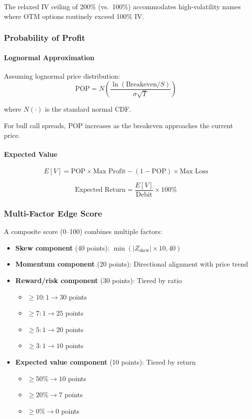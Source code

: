 The relaxed IV ceiling of 200\% (vs.\ 100\%) accommodates high-volatility names where OTM options routinely exceed 100\% IV.

\subsubsection{Probability of Profit}

\paragraph{Lognormal Approximation}

Assuming lognormal price distribution:
\[
\text{POP} = N\left(\frac{\ln(\text{Breakeven}/S)}{\sigma\sqrt{T}}\right)
\]

where $N(\cdot)$ is the standard normal CDF.

For bull call spreads, POP increases as the breakeven approaches the current price.

\paragraph{Expected Value}

\[
E[V] = \text{POP} \times \text{Max Profit} - (1 - \text{POP}) \times \text{Max Loss}
\]

\[
\text{Expected Return} = \frac{E[V]}{\text{Debit}} \times 100\%
\]

\subsubsection{Multi-Factor Edge Score}

A composite score (0--100) combines multiple factors:

\begin{itemize}
  \item \textbf{Skew component} (40 points): $\min(|Z_{\text{skew}}| \times 10, 40)$
  \item \textbf{Momentum component} (20 points): Directional alignment with price trend
  \item \textbf{Reward/risk component} (30 points): Tiered by ratio
    \begin{itemize}
      \item $\geq 10:1 \to 30$ points
      \item $\geq 7:1 \to 25$ points
      \item $\geq 5:1 \to 20$ points
      \item $\geq 3:1 \to 10$ points
    \end{itemize}
  \item \textbf{Expected value component} (10 points): Tiered by return
    \begin{itemize}
      \item $\geq 50\% \to 10$ points
      \item $\geq 20\% \to 7$ points
      \item $\geq 0\% \to 0$ points
    \end{itemize}
\end{itemize}

